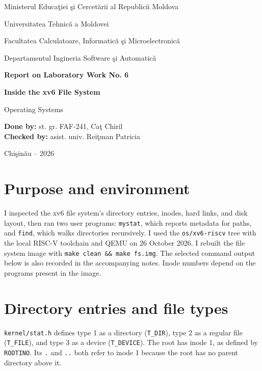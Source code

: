 \documentclass[12pt]{article}
\begin{document}
\begin{titlepage}
\centering
{\large Ministerul Educa\c{t}iei \c{s}i Cercet\u{a}rii al Republicii Moldova\par}
\vspace{0.45cm}
{\large Universitatea Tehnic\u{a} a Moldovei\par}
\vspace{0.45cm}
{\large Facultatea Calculatoare, Informatic\u{a} \c{s}i Microelectronic\u{a}\par}
\vspace{0.45cm}
{\large Departamentul Ingineria Software \c{s}i Automatic\u{a}\par}
\vspace{3cm}
{\Large\bfseries Report on Laboratory Work No. 6\par}
\vspace{0.55cm}
{\LARGE\bfseries Inside the xv6 File System\par}
\vspace{0.35cm}
{\large Operating Systems\par}
\vfill
\begin{flushleft}
\textbf{Done by:} st. gr. FAF-241, Ca\c{t} Chiril\\[0.8cm]
\textbf{Checked by:} asist. univ. Rei\c{t}man Patricia
\end{flushleft}
\vfill
{Chi\c{s}in\u{a}u -- 2026\par}
\end{titlepage}

\tableofcontents
\clearpage
{}

\section{Purpose and environment}
I inspected the xv6 file system's directory entries, inodes, hard links, and disk
layout, then ran two user programs: \texttt{mystat}, which reports metadata for
paths, and \texttt{find}, which walks directories recursively. I used the
\texttt{os/xv6-riscv} tree with the local RISC-V toolchain and QEMU on
26 October 2026. I rebuilt the file system image with
\texttt{make clean \&\& make fs.img}. The selected command output below is
also recorded in the accompanying notes. Inode numbers depend on the
programs present in the image.

\section{Directory entries and file types}
\texttt{kernel/stat.h} defines type 1 as a directory (\texttt{T\_DIR}), type 2
as a regular file (\texttt{T\_FILE}), and type 3 as a device
(\texttt{T\_DEVICE}). The root has inode 1, as defined by \texttt{ROOTINO}.
Its \texttt{.} and \texttt{..} both refer to inode 1 because the root has no
parent directory above it.
\end{document}
